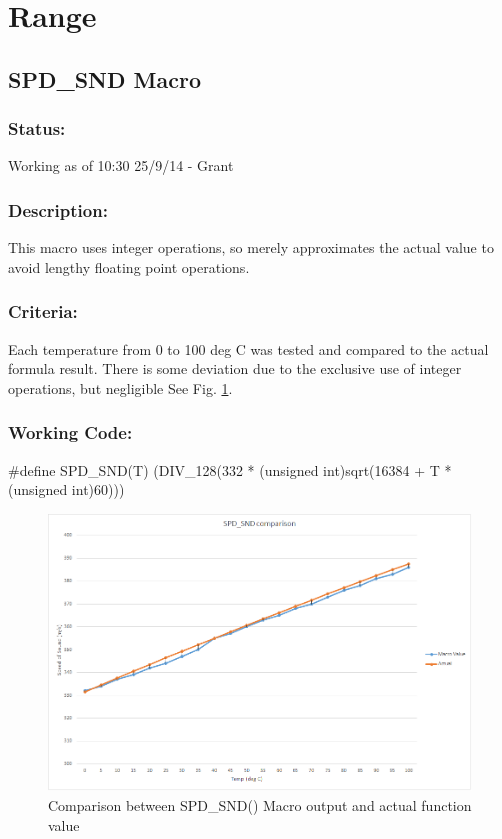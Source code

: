 \documentclass[]{article}
\begin{document}
\newpage
\section{Range}

\subsection{SPD\_SND Macro}
\subsubsection{Status:}
Working as of 10:30 25/9/14 - Grant

\subsubsection{Description:}
This macro uses integer operations, so merely approximates the actual value to avoid lengthy floating point operations. 

\subsubsection{Criteria:}
Each temperature from 0 to 100 deg C was tested and compared to the actual formula result. There is some deviation due to the exclusive use of integer operations, but negligible See Fig. \ref{fig:SND_comp}.\newline 

\subsubsection{Working Code:}
\#define SPD\_SND(T) (DIV\_128(332 * (unsigned int)sqrt(16384 + T * (unsigned int)60)))

\begin{figure}
	\centering
	\includegraphics[width=0.7\linewidth]{SND_comp}
	\caption{Comparison between SPD\_SND() Macro output and actual function value}
	\label{fig:SND_comp}
\end{figure}
\end{document}
